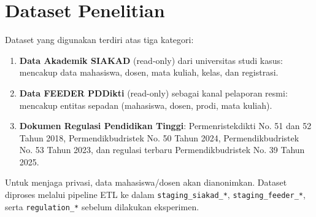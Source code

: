 \documentclass[12pt,a4paper,oneside]{report}
\begin{document}
        \section{Dataset Penelitian}
        Dataset yang digunakan terdiri atas tiga kategori:
        \begin{enumerate}
            \item \textbf{Data Akademik SIAKAD} (read-only) dari universitas studi kasus: mencakup data mahasiswa, dosen, mata kuliah, kelas, dan registrasi.
            \item \textbf{Data FEEDER PDDikti} (read-only) sebagai kanal pelaporan resmi: mencakup entitas sepadan (mahasiswa, dosen, prodi, mata kuliah).
            \item \textbf{Dokumen Regulasi Pendidikan Tinggi}: Permenristekdikti No. 51 dan 52 Tahun 2018, Permendikbudristek No. 50 Tahun 2024, Permendikbudristek No. 53 Tahun 2023, dan regulasi terbaru Permendikbudristek No. 39 Tahun 2025.
        \end{enumerate}

        Untuk menjaga privasi, data mahasiswa/dosen akan dianonimkan. Dataset diproses melalui pipeline ETL ke dalam \texttt{staging\_siakad\_*}, \texttt{staging\_feeder\_*}, serta \texttt{regulation\_*} sebelum dilakukan eksperimen.
\end{document}
